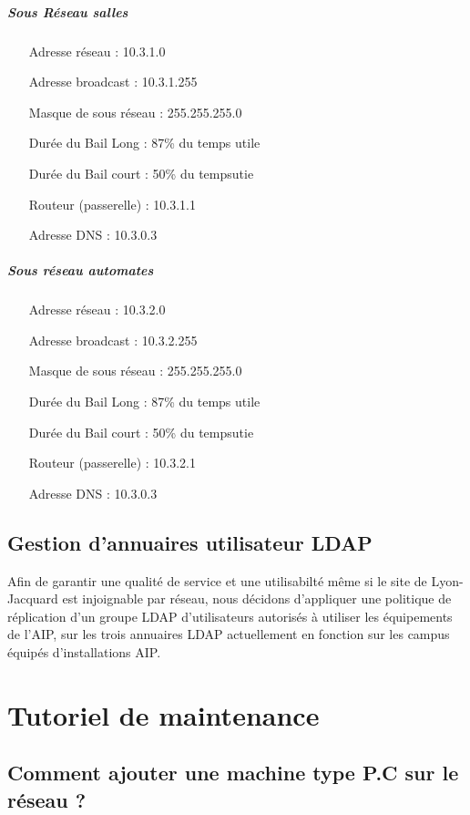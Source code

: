 \documentclass[a4paper]{article}
\begin{document}
\subparagraph{Sous Réseau salles}
\begin{itemize}
\item[Adresse réseau]: 10.3.1.0
\item[Adresse broadcast]: 10.3.1.255
\item[Masque de sous réseau]: 255.255.255.0
\item[Durée du Bail Long]: 87\% du temps utile
\item[Durée du Bail court]: 50\% du tempsutie
\item[Routeur (passerelle)]: 10.3.1.1
\item[Adresse DNS]: 10.3.0.3
\end{itemize}

\subparagraph{Sous réseau automates}
\begin{itemize}
\item[Adresse réseau]: 10.3.2.0
\item[Adresse broadcast]: 10.3.2.255
\item[Masque de sous réseau]: 255.255.255.0
\item[Durée du Bail Long]: 87\% du temps utile
\item[Durée du Bail court]: 50\% du tempsutie
\item[Routeur (passerelle)]: 10.3.2.1
\item[Adresse DNS]: 10.3.0.3
\end{itemize}

\subsection{Gestion d'annuaires utilisateur LDAP}

Afin de garantir une qualité de service et une utilisabilté même si le site de Lyon-Jacquard est injoignable par réseau, nous décidons d'appliquer une politique de réplication d'un groupe LDAP d'utilisateurs autorisés à utiliser les équipements de l'AIP, sur les trois annuaires LDAP actuellement en fonction sur les campus équipés d'installations AIP.

\section{Tutoriel de maintenance}

\subsection{Comment ajouter une machine type P.C sur le réseau ?}
\end{document}
